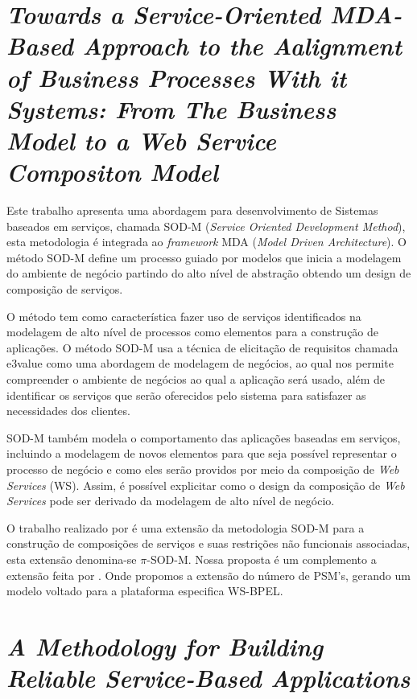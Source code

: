 \section{\textit{Towards a Service-Oriented MDA-Based Approach to the Aalignment of Business Processes With it Systems: From The Business Model to a Web Service Compositon Model}}

Este trabalho apresenta uma abordagem para desenvolvimento de Sistemas baseados em serviços, chamada SOD-M (\textit{Service Oriented Development Method}), esta metodologia é integrada ao \textit{framework} MDA (\textit{Model Driven Architecture}). O método SOD-M define um processo guiado por modelos que inicia a modelagem do ambiente de negócio partindo do alto nível de abstração obtendo um design de composição de serviços. 

O método tem como característica fazer uso de serviços identificados na modelagem de alto nível de processos como elementos para a construção de aplicações. O método SOD-M usa a técnica de elicitação de requisitos chamada e3value como uma abordagem de modelagem de negócios, ao qual nos permite compreender o ambiente de negócios ao qual a aplicação será usado, além de identificar os serviços que serão oferecidos pelo sistema para satisfazer as necessidades dos clientes.
 
SOD-M também modela o comportamento das aplicações baseadas em serviços, incluindo a modelagem de novos elementos para que seja possível representar o processo de negócio e como eles serão providos por meio da composição de \textit{Web Services} (WS). Assim, é possível explicitar como o design da composição de \textit{Web Services} pode ser derivado da modelagem de alto nível de negócio.

O trabalho realizado por \cite{Placido} é uma extensão da metodologia SOD-M para a construção de composições de serviços e suas restrições não funcionais associadas, esta extensão denomina-se $\pi$-SOD-M. Nossa proposta é um complemento a extensão feita por \cite{Placido}. Onde propomos a extensão do número de PSM's, gerando um modelo voltado para a plataforma especifica WS-BPEL.

%
\section{\textit{A Methodology for Building Reliable Service-Based Applications}}

